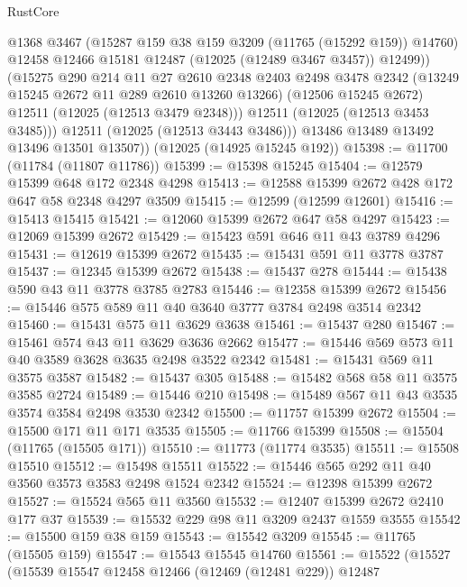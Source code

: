 \begin{lexlean}{RustCore}
\begin{coremodule}
                @1368
                @3467
                (@15287 @159 @38 @159 @3209 (@11765 (@15292 @159)) @14760)
                @12458
                @12466
                @15181
                @12487
                (@12025 (@12489 @3467 @3457))
                @12499))
            (@15275
              @290
              @214
              @11
              @27
              @2610
              @2348
              @2403
              @2498
              @3478
              @2342
              (@13249 @15245 @2672 @11 @289 @2610 @13260 @13266)
              (@12506 @15245 @2672)
              @12511
              (@12025 (@12513 @3479 @2348)))
            @12511
            (@12025 (@12513 @3453 @3485)))
          @12511
          (@12025 (@12513 @3443 @3486)))
        @13486
        @13489
        @13492
        @13496
        @13501
        @13507))
    (@12025 (@14925 @15245 @192))
@15398 := @11700 (@11784 (@11807 @11786))
@15399 := @15398 @15245
@15404 := @12579 @15399 @648 @172 @2348 @4298
@15413 := @12588 @15399 @2672 @428 @172 @647 @58 @2348 @4297 @3509
@15415 := @12599 (@12599 @12601)
@15416 := @15413 @15415
@15421 := @12060 @15399 @2672 @647 @58 @4297
@15423 := @12069 @15399 @2672
@15429 := @15423 @591 @646 @11 @43 @3789 @4296
@15431 := @12619 @15399 @2672
@15435 := @15431 @591 @11 @3778 @3787
@15437 := @12345 @15399 @2672
@15438 := @15437 @278
@15444 := @15438 @590 @43 @11 @3778 @3785 @2783
@15446 := @12358 @15399 @2672
@15456 := @15446 @575 @589 @11 @40 @3640 @3777 @3784 @2498 @3514 @2342
@15460 := @15431 @575 @11 @3629 @3638
@15461 := @15437 @280
@15467 := @15461 @574 @43 @11 @3629 @3636 @2662
@15477 := @15446 @569 @573 @11 @40 @3589 @3628 @3635 @2498 @3522 @2342
@15481 := @15431 @569 @11 @3575 @3587
@15482 := @15437 @305
@15488 := @15482 @568 @58 @11 @3575 @3585 @2724
@15489 := @15446 @210
@15498 := @15489 @567 @11 @43 @3535 @3574 @3584 @2498 @3530 @2342
@15500 := @11757 @15399 @2672
@15504 := @15500 @171 @11 @171 @3535
@15505 := @11766 @15399
@15508 := @15504 (@11765 (@15505 @171))
@15510 := @11773 (@11774 @3535)
@15511 := @15508 @15510
@15512 := @15498 @15511
@15522 := @15446 @565 @292 @11 @40 @3560 @3573 @3583 @2498 @1524 @2342
@15524 := @12398 @15399 @2672
@15527 := @15524 @565 @11 @3560
@15532 := @12407 @15399 @2672 @2410 @177 @37
@15539 := @15532 @229 @98 @11 @3209 @2437 @1559 @3555
@15542 := @15500 @159 @38 @159
@15543 := @15542 @3209
@15545 := @11765 (@15505 @159)
@15547 := @15543 @15545 @14760
@15561 := @15522
    (@15527
      (@15539
        @15547
        @12458
        @12466
        (@12469 (@12481 @229))
        @12487

\end{coremodule}
\end{lexlean}
